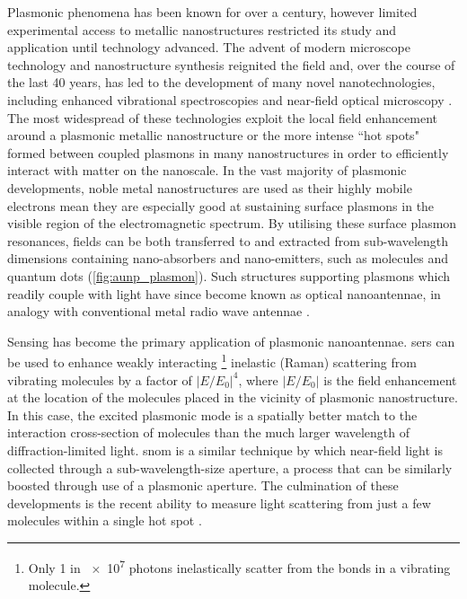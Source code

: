\documentclass[12pt, a4paper, twoside]{book}
\begin{document}
Plasmonic phenomena has been known for over a century, however limited experimental access to metallic nanostructures restricted its study and application until technology advanced. The advent of modern microscope technology and nanostructure synthesis reignited the field and, over the course of the last 40 years, has led to the development of many novel nanotechnologies, including enhanced vibrational spectroscopies \cite{fleischmann1974, jeanmaire1977} and near-field optical microscopy \cite{ash1972super, pohl1984optical, lewis1984development, pohl1986optical, harootunian1986super, betzig1988near}. The most widespread of these technologies exploit the local field enhancement around a plasmonic metallic nanostructure or the more intense ``hot spots" formed between coupled plasmons in many nanostructures in order to efficiently interact with matter on the nanoscale. In the vast majority of plasmonic developments, noble metal nanostructures are used as their highly mobile electrons mean they are especially good at sustaining surface plasmons in the visible region of the electromagnetic spectrum. By utilising these surface plasmon resonances, fields can be both transferred to and extracted from sub-wavelength dimensions containing nano-absorbers and nano-emitters, such as molecules and quantum dots (\autoref{fig:aunp_plasmon}). Such structures supporting plasmons which readily couple with light have since become known as optical nanoantennae, in analogy with conventional metal radio wave antennae \cite{novotny2011}.

Sensing has become the primary application of plasmonic nanoantennae. \Gls{sers} can be used to enhance weakly interacting%
\footnote{Only 1 in \num{e7} photons inelastically scatter from the bonds in a vibrating molecule.}
inelastic (Raman) scattering from vibrating molecules \cite{raman1928} by a factor of $|E/E_0|^4$, where $|E/E_0|$ is the field enhancement at the location of the molecules placed in the vicinity of plasmonic nanostructure. In this case, the excited plasmonic mode is a spatially better match to the interaction cross-section of molecules than the much larger wavelength of diffraction-limited light. \Gls{snom} is a similar technique by which near-field light is collected through a sub-wavelength-size aperture, a process that can be similarly boosted through use of a plasmonic aperture. The culmination of these developments is the recent ability to measure light scattering from just a few molecules within a single hot spot \cite{zhang2013}.
\end{document}
